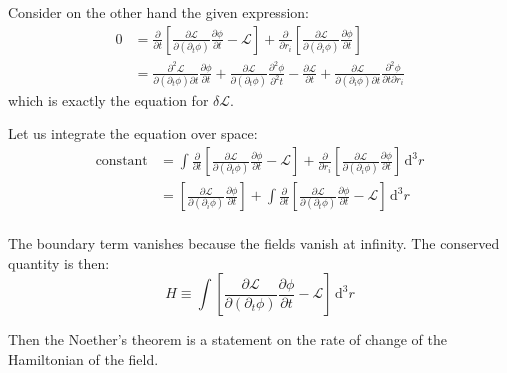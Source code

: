 \documentclass[12pt]{article}
\begin{document}
Consider on the other hand the given expression:
\begin{equation}
    \begin{split}
        0 &= \frac{\partial }{\partial t} \left[ \frac{\partial \mathcal{L}}{\partial (\partial_{t} \phi)} \frac{\partial \phi}{\partial t} - \mathcal{L} \right] + \frac{\partial }{\partial r_{i}} \left[ \frac{\partial \mathcal{L}}{\partial (\partial_{i} \phi)} \frac{\partial \phi}{\partial t} \right] \\
        &= \frac{\partial^{2} \mathcal{L}}{\partial (\partial_{t} \phi) \partial t} \frac{\partial \phi}{\partial t} + \frac{\partial \mathcal{L}}{\partial (\partial_{t} \phi)} \frac{\partial^{2} \phi}{\partial^{2} t} - \frac{\partial \mathcal{L}}{\partial t} + \frac{\partial \mathcal{L}}{\partial (\partial_{i} \phi) \partial t} \frac{\partial^{2} \phi}{\partial t \partial r_{i}}
    \end{split}
\end{equation}
which is exactly the equation for $\delta \mathcal{L}$.

Let us integrate the equation over space:
\begin{equation}
    \begin{split}
        \text{constant} &= \int \frac{\partial }{\partial t} \left[ \frac{\partial \mathcal{L}}{\partial (\partial_{t} \phi)} \frac{\partial \phi}{\partial t} - \mathcal{L} \right] + \frac{\partial }{\partial r_{i}} \left[ \frac{\partial \mathcal{L}}{\partial (\partial_{i} \phi)} \frac{\partial \phi}{\partial t} \right] \, \mathrm{d}^{3}r \\
        &= \left[ \frac{\partial \mathcal{L}}{\partial (\partial_{i} \phi)} \frac{\partial \phi}{\partial t} \right] + \int \frac{\partial }{\partial t} \left[ \frac{\partial \mathcal{L}}{\partial (\partial_{t} \phi)} \frac{\partial \phi}{\partial t} - \mathcal{L} \right] \, \mathrm{d}^{3}r \\
    \end{split}
\end{equation}

The boundary term vanishes because the fields vanish at infinity. The conserved quantity is then:
\begin{equation}
    H \equiv \int \left[ \frac{\partial \mathcal{L}}{\partial (\partial_{t} \phi)} \frac{\partial \phi}{\partial t} - \mathcal{L} \right] \, \mathrm{d}^{3}r
\end{equation}

Then the Noether's theorem is a statement on the rate of change of the Hamiltonian of the field.
\end{document}
